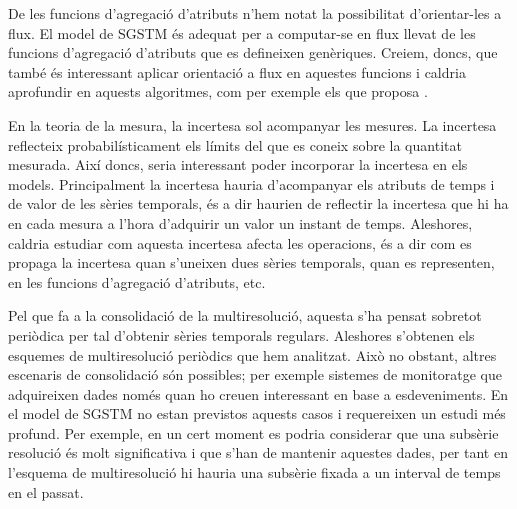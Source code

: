De les funcions d'agregació d'atributs n'hem notat la possibilitat
d'orientar-les a flux. El model de \gls{SGSTM} és adequat per a
computar-se en flux llevat de les funcions d'agregació d'atributs que
es defineixen genèriques. Creiem, doncs, que també és interessant
aplicar orientació a flux en aquestes funcions i caldria aprofundir en
aquests algoritmes, com per exemple els que proposa
\textcite{cormode08:pods}.



En la teoria de la mesura, la incertesa sol acompanyar les mesures. La
incertesa reflecteix probabilísticament els límits del que es coneix
sobre la quantitat mesurada.  Així doncs, seria interessant poder
incorporar la incertesa en els models.  Principalment la incertesa
hauria d'acompanyar els atributs de temps i de valor de les sèries
temporals, és a dir haurien de reflectir la incertesa que hi ha en
cada mesura a l'hora d'adquirir un valor un instant de
temps. Aleshores, caldria estudiar com aquesta incertesa afecta les
operacions, és a dir com es propaga la incertesa quan s'uneixen dues
sèries temporals, quan es representen, en les funcions d'agregació
d'atributs, etc.




Pel que fa a la consolidació de la multiresolució, aquesta s'ha pensat
sobretot periòdica per tal d'obtenir sèries temporals regulars.
Aleshores s'obtenen els esquemes de multiresolució periòdics que hem
analitzat. Això no obstant, altres escenaris de consolidació són
possibles; per exemple sistemes de monitoratge que adquireixen dades
només quan ho creuen interessant en base a esdeveniments.  En el model
de \gls{SGSTM} no estan previstos aquests casos i requereixen un
estudi més profund. Per exemple, en un cert moment es podria
considerar que una subsèrie resolució és molt significativa i que
s'han de mantenir aquestes dades, per tant en l'esquema de
multiresolució hi hauria una subsèrie fixada a un interval de temps en
el passat.





